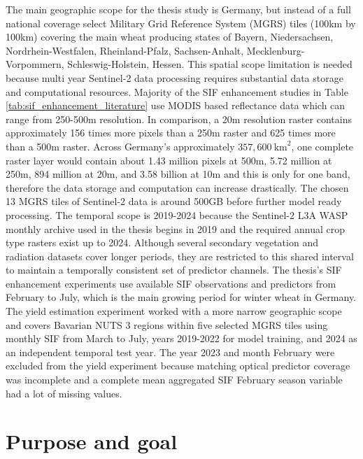 The main geographic scope for the thesis study is Germany, but instead of a full national coverage select Military Grid Reference System (MGRS) tiles (100km by 100km) covering the main wheat producing states of Bayern, Niedersachsen, Nordrhein-Westfalen, Rheinland-Pfalz, Sachsen-Anhalt, Mecklenburg-Vorpommern, Schleswig-Holstein, Hessen. This spatial scope limitation is needed because multi year Sentinel-2 data processing requires substantial data storage and computational resources. Majority of the SIF enhancement studies in Table \ref{tab:sif_enhancement_literature} use MODIS based reflectance data which can range from 250-500m resolution. In comparison, a 20m resolution raster contains approximately 156 times more pixels than a 250m raster and 625 times more than a 500m raster. Across Germany’s approximately \(357{,}600~\mathrm{km}^2\), one complete raster layer would contain about 1.43 million pixels at 500m, 5.72 million at 250m, 894 million at 20m, and 3.58 billion at 10m and this is only for one band, therefore the data storage and computation can increase drastically. The chosen 13 MGRS tiles of Sentinel-2 data is around 500GB before further model ready processing. The temporal scope is 2019-2024 because the Sentinel-2 L3A WASP monthly archive used in the thesis begins in 2019 and the required annual crop type rasters exist up to 2024. Although several secondary vegetation and radiation datasets cover longer periods, they are restricted to this shared interval to maintain a temporally consistent set of predictor channels. The thesis's SIF enhancement experiments use available SIF observations and predictors from February to July, which is the main growing period for winter wheat in Germany. The yield estimation experiment worked with a more narrow geographic scope and covers Bavarian NUTS 3 regions within five selected MGRS tiles using monthly SIF from March to July, years 2019-2022 for model training, and 2024 as an independent temporal test year. The year 2023 and month February were excluded from the yield experiment because matching optical predictor coverage was incomplete and a complete mean aggregated SIF February season variable had a lot of missing values.

\section{Purpose and goal\label{sec:purpose_and_goal}}

